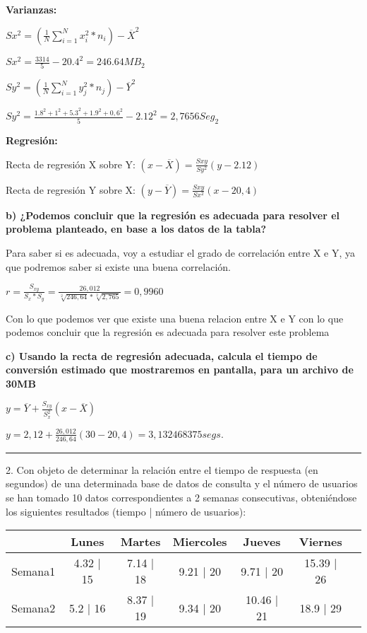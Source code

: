 \documentclass{article}
\begin{document}
\textbf{Varianzas:}

\(Sx^{2} = (\frac{1}{N} \displaystyle\sum_{i=1}^{N} x_{i}^{2} * n_{i}) - \overline{X}^{2} \)

\(Sx^ {2} = \frac{3314}{5}  - 20.4^{2} = 246.64 MB_{2}\)

\(Sy^{2} = (\frac{1}{N} \displaystyle\sum_{i=1}^{N} y_{j}^{2} * n_{j}) - \overline{Y}^{2} \)

\(Sy^ {2} = \frac{1.8^{2} + 1^{2} + 5.3^{2} + 1.9^{2} + 0,6^{2}}{5}  - 2.12^{2} = 2,7656  Seg_{2}\)

\textbf{Regresi\'on: }

Recta de regresi\'on X sobre Y:
\((x - \overline{X}) = \frac{Sxy}{Sy^{2}} (y - 2.12)\)

Recta de regresi\'on Y sobre X:
\((y - \overline{Y}) = \frac{Sxy}{Sx^{2}} (x - 20,4) \)


\textbf{b) ¿Podemos concluir que la regresi\'on es adecuada para resolver el problema planteado, en base a los datos de la tabla? }

Para saber si es adecuada, voy a estudiar el grado de correlaci\'on entre X e Y, ya que podremos saber si existe una buena correlaci\'on.

\( r =  \frac{S_{xy}}{S_{x} * S_{y}} = \frac{26,012}{\sqrt[2]{246,64} * \sqrt[2]{2,765}} = 0,9960\)

Con lo que podemos ver que existe una buena relacion entre X e Y con lo que podemos concluir que la regresi\'on es adecuada para resolver este problema

\textbf{c) Usando la recta de regresi\'on adecuada, calcula el tiempo de conversi\'on estimado que mostraremos en pantalla, para un archivo de 30MB}

\(y = \overline{Y}  + \frac{S_{xy}}{S_{x}^2} (x - \overline{X})\)

\(y = 2,12 + \frac{26,012}{246,64}(30 - 20,4) = 3,132468375 segs.\)

\rule{123mm}{0.5mm}

2. Con objeto de determinar la relaci\'on entre el tiempo de respuesta (en segundos) de una determinada base de datos de consulta y el n\'umero de usuarios se han tomado 10 datos correspondientes a 2 semanas consecutivas, obteni\'endose los siguientes resultados (tiempo | número de usuarios):

\begin{tabular}{|l|c|c|c|c|c|c}
        & Lunes & Martes & Miercoles & Jueves & Viernes\\
\hline
Semana1 & 4.32 | 15 & 7.14 | 18 & 9.21 | 20 & 9.71 | 20 & 15.39 | 26\\
\hline
Semana2 & 5.2 | 16 & 8.37 | 19 & 9.34 | 20 & 10.46 | 21 & 18.9 | 29\\
\end{tabular}
\end{document}
